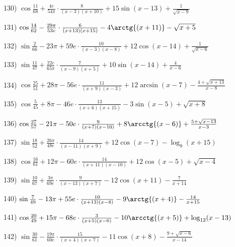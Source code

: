 \documentclass[11pt,ukrainian]{article}
\begin{document}
\smallskip\par
130) \space 
{ ${\cos\frac{11}{68}} + \frac{4 e}{54{\pi}}\cdot {\frac{8}{(x - 3)(x + 10)}} + {15\sin{(x - 13)}} + {\frac{1}{\sqrt{x - 9}}}$}
\smallskip\par
131) \space 
{ ${\cos\frac{14}{62}} - \frac{29{\pi}}{53 e}\cdot {\frac{6}{(x + 13)(x + 15)}} - {4\arctg{(x + 11)}} - {\sqrt{x + 5}}$}
\smallskip\par
132) \space 
{ ${\sin\frac{2}{66}} - 23{\pi} + 59 e\cdot {\frac{10}{(x - 3)(x - 8)}} + {12\cos{(x - 14)}} + {\frac{1}{\sqrt{x - 6}}}$}
\smallskip\par
133) \space 
{ ${\sin\frac{11}{47}} + \frac{22 e}{65{\pi}}\cdot {\frac{7}{(x - 9)(x + 5)}} + {10\sin{(x - 14)}} + { \frac{4}{x - 6}}$}
\smallskip\par
134) \space 
{ ${\cos\frac{25}{51}} + 28{\pi} - 56 e\cdot {\frac{11}{(x + 9)(x - 3)}} + {12\arcsin{(x - 7)}} - {\frac{4 + \sqrt{x + 13}}{x - 8}}$}
\smallskip\par
135) \space 
{ ${\cos\frac{5}{45}} + 8{\pi} - 46 e\cdot {\frac{13}{(x + 6)(x + 15)}} - {3\sin{(x - 5)}} + {\sqrt{x + 8}}$}
\smallskip\par
136) \space 
{ ${\cos\frac{27}{57}} - 21{\pi} - 50 e\cdot {\frac{9}{(x + 7)(x - 10)}} + {8\arcctg{(x - 6)}} + {\frac{5 + \sqrt{x - 13}}{x - 3}}$}
\smallskip\par
137) \space 
{ ${\sin\frac{18}{52}} + \frac{26{\pi}}{48 e}\cdot {\frac{14}{(x - 11)(x + 9)}} + {12\cos{(x - 7)}} - {\log_{9}(x + 15)}$}
\smallskip\par
138) \space 
{ ${\cos\frac{16}{61}} + 12{\pi} - 60 e\cdot {\frac{14}{(x + 11)(x - 10)}} + {12\cos{(x - 5)}} + {\sqrt{x - 4}}$}
\smallskip\par
139) \space 
{ ${\sin\frac{10}{67}} + \frac{3{\pi}}{69 e}\cdot {\frac{9}{(x - 13)(x + 7)}} - {12\cos{(x + 11)}} - { \frac{7}{x + 14}}$}
\smallskip\par
140) \space 
{ ${\sin\frac{7}{49}} - 13{\pi} + 55 e\cdot {\frac{10}{(x + 13)(x - 8)}} - {9\arctg{(x + 4)}} - { \frac{14}{x + 15}}$}
\smallskip\par
141) \space 
{ ${\cos\frac{20}{49}} + 15{\pi} - 68 e\cdot {\frac{3}{(x + 5)(x - 6)}} - {10\arcctg{(x + 5)}} + {\log_{12}(x - 13)}$}
\smallskip\par
142) \space 
{ ${\sin\frac{30}{61}} - \frac{19{\pi}}{60 e}\cdot {\frac{15}{(x + 4)(x + 7)}} - {11\cos{(x + 8)}} - {\frac{9 + \sqrt{x - 6}}{x - 14}}$}
\end{document}
